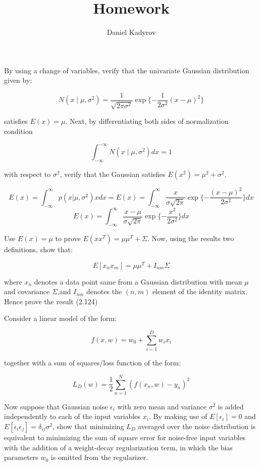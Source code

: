 \documentclass{homework}
\title{Homework}
\author{Daniel Kadyrov}
\begin{document}
\maketitle

\begin{problem}[1]
    By using a change of variables, verify that the univariate Gaussian distribution given by:

    $$
    N(x \mid \mu , \sigma^2) = \frac{1}{\sqrt{2\pi\sigma^2}}\exp\{
        -\frac{1}{2\sigma^2}(x-\mu)^2
        \}
    $$

    satisfies $E(x) = \mu$. Next, by differentiating both sides of normalization condition

    $$
    \int_{-\infty}^{-\infty}N(x \mid \mu, \sigma^2) dx = 1
    $$

    with respect to $\sigma^2$, verify that the Gaussian satisfies $E(x^2)=\mu^2+\sigma^2$.
\end{problem}

\begin{solution}
    $$
    E(x) = \int_{-\infty}^{\infty} p(x|\mu, \sigma^2)x dx = E(x) = \int_{-\infty}^{\infty} \frac{x}{\sigma\sqrt{2\pi}}\exp\{-\frac{(x-\mu)^2}{2\sigma^2}\} dx
    $$
    $$
    E(x) = \int_{-\infty}^{\infty} \frac{x-\mu}{\sigma\sqrt{2\pi}}\exp\{-\frac{x^2}{2\sigma^2}\} dx
    $$

\end{solution}

\begin{problem}[2]
    Use $E(x) = \mu$ to prove $E(xx^T)=\mu\mu^T+\Sigma$. Now, using the results two definitions, show that:
    
    $$
    E[x_n x_m] = \mu\mu^T + I_{nm}\Sigma
    $$

    where $x_n$ denotes a data point same from a Gaussian distribution with mean $\mu$ and covariance $\Sigma$,and $I_{nm}$ denotes the $(n,m)$ element of the identity matrix. Hence prove the result (2.124)
\end{problem}

\begin{problem}[3]
    Consider a linear model of the form:

    $$
    f(x,w) = w_0 + \sum_{i=1}^D w_i x_i
    $$

    together with a sum of squares/loss function of the form:

    $$
    L_D(w) = \frac{1}{2} \sum_{n=1}^{N} (f(x_n,w)-y_n)^2
    $$

    Now suppose that Gaussian noise $\epsilon_i$ with zero mean and variance $\sigma^2$ is added independently to each of the input variables $x_i$. By making use of $E[\epsilon_i]=0$ and $E[\epsilon_i \epsilon_j]=\delta_{ij}\sigma^2$, show that minimizing $L_D$ averaged over the noise distribution is equivalent to minimizing the sum of square error for noise-free input variables with the addition of a weight-decay regularization term, in which the bias parameters $w_0$ is omitted from the regularizer.
\end{problem}
\end{document}
